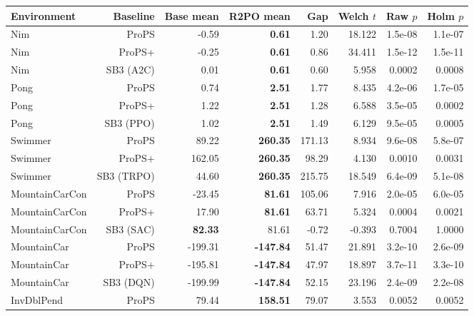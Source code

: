 \begin{tabular}{@{}lrrrrrrr@{}}
\toprule
Environment & Baseline & Base mean & R2PO mean & Gap & Welch $t$ & Raw $p$ & Holm $p$ \\
\midrule
Nim & ProPS & -0.59 & \cellcolor{bestcolor}\textbf{0.61} & 1.20 & 18.122 & 1.5e-08 & 1.1e-07 \\
Nim & ProPS+ & -0.25 & \cellcolor{bestcolor}\textbf{0.61} & 0.86 & 34.411 & 1.5e-12 & 1.5e-11 \\
Nim & SB3 (A2C) & 0.01 & \cellcolor{bestcolor}\textbf{0.61} & 0.60 & 5.958 & 0.0002 & 0.0008 \\
Pong & ProPS & 0.74 & \cellcolor{bestcolor}\textbf{2.51} & 1.77 & 8.435 & 4.2e-06 & 1.7e-05 \\
Pong & ProPS+ & 1.22 & \cellcolor{bestcolor}\textbf{2.51} & 1.28 & 6.588 & 3.5e-05 & 0.0002 \\
Pong & SB3 (PPO) & 1.02 & \cellcolor{bestcolor}\textbf{2.51} & 1.49 & 6.129 & 9.5e-05 & 0.0005 \\
Swimmer & ProPS & 89.22 & \cellcolor{bestcolor}\textbf{260.35} & 171.13 & 8.934 & 9.6e-08 & 5.8e-07 \\
Swimmer & ProPS+ & 162.05 & \cellcolor{bestcolor}\textbf{260.35} & 98.29 & 4.130 & 0.0010 & 0.0031 \\
Swimmer & SB3 (TRPO) & 44.60 & \cellcolor{bestcolor}\textbf{260.35} & 215.75 & 18.549 & 6.4e-09 & 5.1e-08 \\
MountainCarCon & ProPS & -23.45 & \cellcolor{bestcolor}\textbf{81.61} & 105.06 & 7.916 & 2.0e-05 & 6.0e-05 \\
MountainCarCon & ProPS+ & 17.90 & \cellcolor{bestcolor}\textbf{81.61} & 63.71 & 5.324 & 0.0004 & 0.0021 \\
MountainCarCon & SB3 (SAC) & \cellcolor{bestcolor}\textbf{82.33} & 81.61 & -0.72 & -0.393 & 0.7004 & 1.0000 \\
MountainCar & ProPS & -199.31 & \cellcolor{bestcolor}\textbf{-147.84} & 51.47 & 21.891 & 3.2e-10 & 2.6e-09 \\
MountainCar & ProPS+ & -195.81 & \cellcolor{bestcolor}\textbf{-147.84} & 47.97 & 18.897 & 3.7e-11 & 3.3e-10 \\
MountainCar & SB3 (DQN) & -199.99 & \cellcolor{bestcolor}\textbf{-147.84} & 52.15 & 23.196 & 2.4e-09 & 2.2e-08 \\
InvDblPend & ProPS & 79.44 & \cellcolor{bestcolor}\textbf{158.51} & 79.07 & 3.553 & 0.0052 & 0.0052 \\

\end{tabular}
